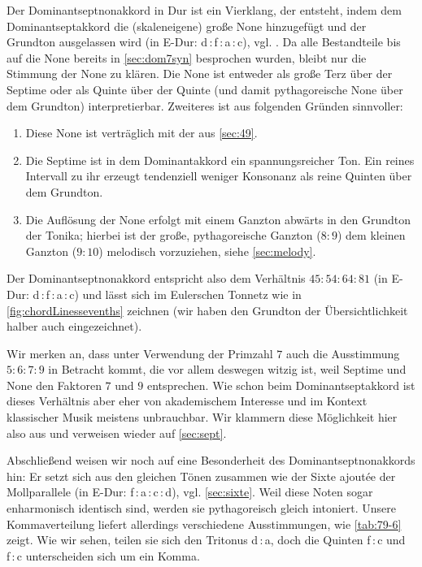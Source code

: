 Der Dominantseptnonakkord in Dur ist ein Vierklang, der entsteht, indem dem
Dominantseptakkord die (skaleneigene) große None hinzugefügt und der Grundton
ausgelassen wird (in \flat E-Dur: d\,:\,f\,:\,\flat a\,:\,c),
vgl. \cite[{}11.3]{Skript}.  Da alle Bestandteile bis auf die None bereits in
\cref{sec:dom7syn} besprochen wurden, bleibt nur die Stimmung der None zu
klären.  Die None ist entweder als große Terz über der Septime oder als Quinte
über der Quinte (und damit pythagoreische None über dem Grundton)
interpretierbar.  Zweiteres ist aus folgenden Gründen sinnvoller:
\begin{enumerate}
  \item Diese None ist verträglich mit der aus \cref{sec:49}.
  \item Die Septime ist in dem Dominantakkord ein spannungsreicher Ton.  Ein
  reines Intervall zu ihr erzeugt tendenziell weniger Konsonanz als reine
  Quinten über dem Grundton.
  \item Die Auflösung der None erfolgt mit einem Ganzton abwärts in den Grundton
  der Tonika; hierbei ist der große, pythagoreische Ganzton ($8:9$) dem kleinen
  Ganzton ($9:10$) melodisch vorzuziehen, siehe \cref{sec:melody}.
\end{enumerate}
Der Dominantseptnonakkord entspricht also dem Verhältnis $45:54:64:81$ (in \flat
E-Dur: \naturalm d\,:\,f\,:\,\flat a\,:\,c) und lässt sich im Eulerschen Tonnetz
wie in \cref{fig:chordLinessevenths} zeichnen (wir haben den Grundton der
Übersichtlichkeit halber auch eingezeichnet).

Wir merken an, dass unter Verwendung der Primzahl $7$ auch die Ausstimmung
$5:6:7:9$ in Betracht kommt, die vor allem deswegen witzig ist, weil Septime und
None den Faktoren $7$ und $9$ entsprechen.  Wie schon beim Dominantseptakkord
ist dieses Verhältnis aber eher von akademischem Interesse und im Kontext
klassischer Musik meistens unbrauchbar. Wir klammern diese Möglichkeit hier also
aus und verweisen wieder auf \cref{sec:sept}.

Abschließend weisen wir noch auf eine Besonderheit des Dominantseptnonakkords
hin: Er setzt sich aus den gleichen Tönen zusammen wie der Sixte ajoutée der
Mollparallele (in \flat E-Dur: f\,:\,\flat a\,:\,c\,:\,d),
vgl. \cref{sec:sixte}. Weil diese Noten sogar enharmonisch identisch sind,
werden sie pythagoreisch gleich intoniert. Unsere Kommaverteilung liefert
allerdings verschiedene Ausstimmungen, wie \cref{tab:79-6} zeigt.  Wie wir
sehen, teilen sie sich den Tritonus \naturalm d\,:\,\flat a, doch die Quinten
f\,:\,c und \naturalm f\,:\,\naturalm c unterscheiden sich um ein Komma.

